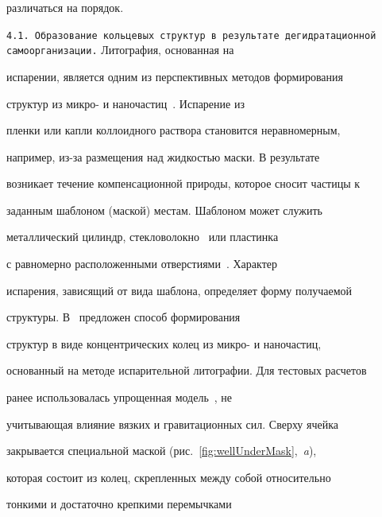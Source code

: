 различаться на порядок.

\smallskip



\hypertarget{kol:4}{}






\smallskip



\texttt{4.1. Образование кольцевых структур в результате дегидратационной самоорганизации.} Литография, основанная на

испарении, является одним из перспективных методов формирования

структур из микро- и наночастиц~\cite{Harris2007}. Испарение из

пленки или капли коллоидного раствора становится неравномерным,

например, из-за размещения над жидкостью маски. В результате

возникает течение компенсационной природы, которое сносит частицы к

заданным шаблоном (маской) местам. Шаблоном может служить

металлический цилиндр, стекловолокно~\cite{Cabane2010} или пластинка

с равномерно расположенными отверстиями~\cite{Harris2007}. Характер

испарения, зависящий от вида шаблона, определяет форму получаемой

структуры. В~\cite{Kolegov2014a} предложен способ формирования

структур в виде концентрических колец из микро- и наночастиц,

основанный на методе испарительной литографии. Для тестовых расчетов

ранее использовалась упрощенная модель~\cite{Kolegov2014a}, не

учитывающая влияние вязких и гравитационных сил. Сверху ячейка

закрывается специальной маской (рис.~\ref{fig:wellUnderMask},~{\sl a}\/),

которая состоит из колец, скрепленных между собой относительно

тонкими и достаточно крепкими перемычками

